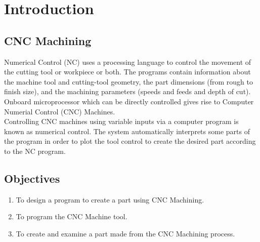 \section{Introduction}
\lhead{\leftmark}
\label{sec:introduction}
\subsection{CNC Machining}
Numerical Control (NC) uses a processing language to control the movement of the cutting tool or workpiece or both. The programs contain information about the machine tool and cutting-tool geometry, the part dimensions (from rough to finish size), and the machining parameters (speeds and feeds and depth of cut). Onboard microprocessor which can be directly controlled gives rise to Computer Numerial Control (CNC) Machines.\\
Controlling CNC machines using variable inputs via a computer program is known as numerical control. The system automatically interprets some parts of the program in order to plot the tool control to create the desired part according to the NC program.
\subsection{Objectives}
\begin{enumerate}
	\item To design a program to create a part using CNC Machining.
	\item To program the CNC Machine tool.
	\item To create and examine a part made from the CNC Machining process.
\end{enumerate}
